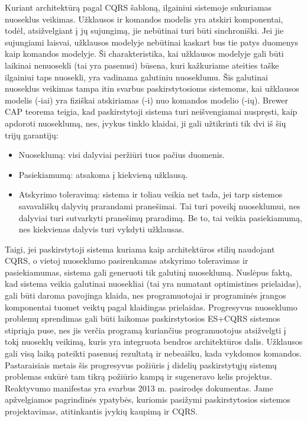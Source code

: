 Kuriant architektūrą pagal CQRS šabloną, ilgainiui sistemoje sukuriamas nuoseklus veikimas. Užklausos ir komandos modelis yra atskiri komponentai, todėl, atsižvelgiant į jų sujungimą, jie nebūtinai turi būti sinchroniški. Jei jie sujungiami laisvai, užklausos modelyje nebūtinai kaskart bus tie patys duomenys kaip komandos modelyje. Ši charakteristika, kai užklausos modelyje gali būti laikinai nenuosekli (tai yra pasenusi) būsena, kuri kažkuriame ateities taške ilgainiui taps nuosekli, yra vadinama galutiniu nuoseklumu. Šis galutinai nuoseklus veikimas tampa itin svarbus paskirstytosioms sistemoms, kai užklausos modelis (-iai) yra fiziškai atskiriamas (-i) nuo komandos modelio (-ių). Brewer CAP teorema \cite{Fox:1999:HYS:822076.822436} teigia, kad paskirstytoji sistema turi neišvengiamai nuspręsti, kaip apdoroti nuoseklumą, nes, įvykus tinklo klaidai, ji gali užtikrinti tik dvi iš šių trijų garantijų:

\begin{itemize}
  \item Nuoseklumą: visi dalyviai peržiūri tuos pačius duomenis.
  \item Pasiekiamumą: atsakoma į kiekvieną užklausą.
  \item Atskyrimo toleravimą: sistema ir toliau veikia net tada, jei tarp sistemos savavališkų dalyvių prarandami pranešimai. Tai turi poveikį nuoseklumui, nes dalyviai turi sutvarkyti pranešimų praradimą. Be to, tai veikia pasiekiamumą, nes kiekvienas dalyvis turi vykdyti užklausas.
\end{itemize}

Taigi, jei paskirstytoji sistema kuriama kaip architektūros stilių naudojant CQRS, o vietoj nuoseklumo pasirenkamas atskyrimo toleravimas ir pasiekiamumas, sistema gali generuoti tik galutinį nuoseklumą. Nuslėpus faktą, kad sistema veikia galutinai nuosekliai (tai yra numatant optimistines prielaidas), gali būti daroma pavojinga klaida, nes programuotojai ir programinės įrangos komponentai tuomet veiktų pagal klaidingas prielaidas. Progresyvus nuoseklumo problemų sprendimas gali būti laikomas paskirstytosios ES+CQRS sistemos stipriąja puse, nes jis verčia programą kuriančius programuotojus atsižvelgti į tokį nuoseklų veikimą, kuris yra integruota bendros architektūros dalis. Užklausos gali visą laiką pateikti pasenusį rezultatą ir nebeaišku, kada vykdomos komandos. Pastaraisiais metais šis progresyvus požiūris į didelių paskirstytųjų sistemų problemas sukūrė tam tikrą požiūrio kampą ir sugeneravo kelis projektus. Reaktyvumo manifestas \cite{ReactiveManifesto} yra svarbus 2013 m. pasirodęs dokumentas. Jame apžvelgiamos pagrindinės ypatybės, kuriomis pasižymi paskirstytosios sistemos projektavimas, atitinkantis įvykių kaupimą ir CQRS.

